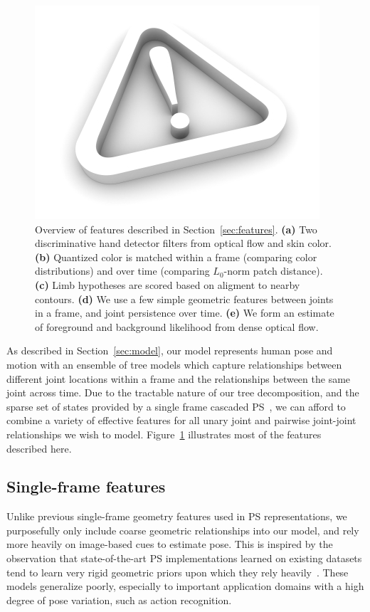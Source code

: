 \begin{figure}[tb!]
\centering
\includegraphics[width=0.90\linewidth]{figs/empty.jpg}
\caption{\small \label{fig:features} Overview of features described in 
Section~\ref{sec:features}. \textbf{(a)} Two discriminative hand detector 
filters from optical flow and skin color. \textbf{(b)} Quantized color is 
matched within a frame (comparing color distributions) and over time (comparing 
$L_0$-norm patch distance). \textbf{(c)} Limb hypotheses are scored based on 
aligment to nearby contours.  \textbf{(d)} We use a few simple geometric 
features between joints in a frame, and joint persistence over time.  
\textbf{(e)} We form an estimate of foreground and background likelihood from 
dense optical flow.}
\end{figure}

As described in Section~\ref{sec:model}, our model represents human pose and 
motion with an ensemble of tree models which capture relationships between 
different joint locations within a frame and the relationships between the same 
joint across time.  Due to the tractable nature of our tree decomposition, and 
the sparse set of states provided by a single frame cascaded 
PS~\cite{sapp10cascades}, we can afford to combine a variety of effective 
features for all unary joint and pairwise joint-joint relationships we wish to 
model.  Figure~\ref{fig:features} illustrates most of the features described 
here.


\subsection{Single-frame features}

 Unlike previous single-frame geometry features used in PS 
representations, we purposefully only include coarse geometric relationships 
into our model, and rely more heavily on image-based cues to estimate pose.  
This is inspired by the observation that state-of-the-art PS implementations 
learned on existing datasets tend to learn very rigid geometric priors upon 
which they rely heavily~\cite{tran10}. These models generalize poorly, 
especially to important application domains with a high degree of pose 
variation, such as action recognition.

